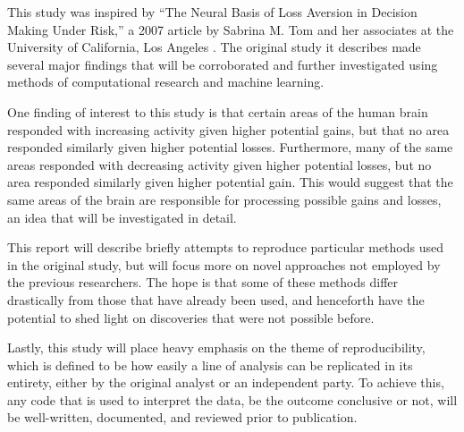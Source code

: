 
\par This study was inspired by ``The Neural Basis of Loss Aversion in Decision
Making Under Risk,'' a 2007 article by Sabrina M. Tom and her associates at the
University of California, Los Angeles \cite{tom2007neural}. The original study
it describes made several major findings that will be corroborated and further
investigated using methods of computational research and machine learning.
\par \indent One finding of interest to this study is that certain areas of the
human brain responded with increasing activity given higher potential gains, but
that no area responded similarly given higher potential losses. Furthermore,
many of the same areas responded with decreasing activity given higher potential
losses, but no area responded similarly given higher potential gain. This would
suggest that the same areas of the brain are responsible for processing possible
gains and losses, an idea that will be investigated in detail.
\par \indent This report will describe briefly attempts to reproduce particular
methods used in the original study, but will focus more on novel approaches not
employed by the previous researchers. The hope is that some of these methods
differ drastically from those that have already been used, and henceforth have
the potential to shed light on discoveries that were not possible before.
\par \indent Lastly, this study will place heavy emphasis on the theme of
reproducibility, which is defined to be how easily a line of analysis can be
replicated in its entirety, either by the original analyst or an independent
party. To achieve this, any code that is used to interpret the data, be the
outcome conclusive or not, will be well-written, documented, and reviewed prior
to publication.